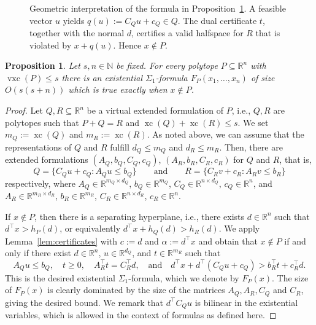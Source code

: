 \documentclass[centering,11pt,reqno]{amsart}
\newtheorem{prop}[theorem]{Proposition}
\theoremstyle{definition}
\newcommand{\R}{\mathbb{R}}
\DeclareMathOperator{\xc}{xc}
\DeclareMathOperator{\vxc}{vxc}
\def\R{\mathbb{R}}
\begin{document}
\begin{figure}[!th]
    \caption{Geometric interpretation of the formula in Proposition~\ref{prop:lb}. 
    A feasible vector $u$ yields $q(u):=C_Qu+c_Q\in Q$. 
    The dual certificate $t$, together with the normal $d$, certifies a valid halfspace for $R$ that is violated by $x+q(u)$. 
    Hence $x\notin P$.}
    \label{fig:lb}
\end{figure}


\begin{prop}\label{prop:lb}
    Let $s,n\in\mathbb{N}$ be fixed.
    For every polytope $P\subseteq\mathbb{R}^n$ with $\vxc(P)\le s$ 
    there is an existential $\Sigma_1$-formula $F_P(x_1,\dots,x_n)$ of size $O(s(s+n))$ which is true exactly when $x\notin P$.
\end{prop}
\begin{proof}
    Let $Q,R\subseteq\mathbb{R}^n$ be a virtual extended formulation of $P$, i.e., $Q,R$ are polytopes such that $P+Q=R$ and $\xc(Q)+\xc(R)\le s$.
    We set $m_Q:=\xc(Q)$ and $m_R:=\xc(R)$.
    As noted above, we can assume that the representations of $Q$ and $R$ fulfill $d_Q\le m_Q$ and $d_R\le m_R$.
    Then, there are extended formulations $(A_Q,b_Q,C_Q,c_Q)$, $(A_R,b_R,C_R,c_R)$ for $Q$ and $R$, that is, 
    \[
    Q=\{C_Qu+c_Q:A_Qu\le b_Q\}\qquad\text{and}\qquad R=\{C_Rv+c_R:A_Rv\le b_R\}
    \]
    respectively, where $A_Q\in\R^{m_Q\times d_Q}$, $b_Q\in\R^{m_Q}$, $C_Q\in\R^{n\times d_Q}$, $c_Q\in\R^{n}$, and $A_R\in\R^{m_R\times d_R}$, $b_R\in\R^{m_R}$, $C_R\in\R^{n\times d_R}$, $c_R\in\R^{n}$.

    If $x\notin P$, then there is a separating hyperplane, i.e., there exists $d\in\R^n$ such that $d^{\top}x>h_P(d)$, or equivalently $d^{\top}x+h_Q(d)>h_R(d)$.
    We apply Lemma~\ref{lem:certificates} with $c:=d$ and $\alpha:=d^{\top}x$ and obtain that $x\notin P$ if and only if there exist $d\in\R^n$, $u\in\R^{d_Q}$, and $t\in\R^{m_R}$ such that
    \[
        A_Qu\le b_Q,\quad t\ge0,\quad A_R^{\top}t=C_R^{\top}d,\quad \text{and}\quad d^{\top}x+d^{\top}(C_Qu+c_Q)>b_R^{\top}t+c_R^{\top}d.
    \]
    This is the desired existential $\Sigma_1$-formula, which we denote by $F_P(x)$.
    The size of $F_P(x)$ is clearly dominated by the size of the matrices $A_Q,A_R,C_Q$ and $C_R$, giving the desired bound.
    We remark that $d^{\top} C_Q u$ is bilinear in the existential variables, which is allowed in the context of formulas as defined here.
\end{proof}  
\end{document}
